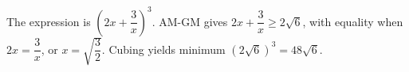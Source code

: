 The expression is $(2x+\dfrac{3}{x})^3$. AM-GM gives $2x+\dfrac{3}{x}\ge2\sqrt6$, with equality when $2x=\dfrac{3}{x}$, or $x=\sqrt{\dfrac{3}{2}}$. Cubing yields minimum $(2\sqrt6)^3=\boxed{48\sqrt6}$.
